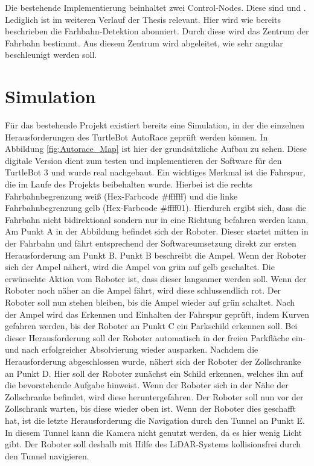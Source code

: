Die bestehende Implementierung beinhaltet zwei Control-Nodes. Diese sind  und . Lediglich  ist im weiteren Verlauf
der Thesis relevant. Hier wird wie bereits beschrieben die Farhbahn-Detektion abonniert. Durch diese wird das Zentrum der Fahrbahn bestimmt. Aus diesem Zentrum wird abgeleitet, wie sehr
angular beschleunigt werden soll.

\section{Simulation}
Für das bestehende Projekt existiert bereits eine Simulation, in der die einzelnen Herausforderungen des TurtleBot AutoRace geprüft werden können. In Abbildung \ref{fig:Autorace_Map}
ist hier der grundsätzliche Aufbau zu sehen. Diese digitale Version dient zum testen und implementieren der Software für den TurtleBot 3 und wurde real nachgebaut. Ein wichtiges
Merkmal ist die Fahrspur, die im Laufe des Projekts beibehalten wurde. Hierbei ist die rechts Fahrbahnbegrenzung weiß (Hex-Farbcode \#ffffff) und die linke Fahrbahnbegrenzung gelb (Hex-Farbcode \#ffff01).
Hierdurch ergibt sich, dass die Fahrbahn nicht bidirektional sondern nur in eine Richtung befahren werden kann.
Am Punkt A in der Abbildung befindet sich der Roboter. Dieser startet mitten in der Fahrbahn und fährt entsprechend der Softwareumsetzung direkt zur ersten Herausforderung am Punkt B.
Punkt B beschreibt die Ampel. Wenn der Roboter sich der Ampel nähert, wird die Ampel von grün auf gelb geschaltet. Die erwünschte Aktion vom Roboter ist, dass dieser langsamer werden soll.
Wenn der Roboter noch näher an die Ampel fährt, wird diese schlussendlich rot. Der Roboter soll nun stehen bleiben, bis die Ampel wieder auf grün schaltet. Nach der Ampel wird das Erkennen und
Einhalten der Fahrspur geprüft, indem Kurven gefahren werden, bis der Roboter an Punkt C ein Parkschild erkennen soll. Bei dieser Herausforderung soll der Roboter automatisch in der freien
Parkfläche ein- und nach erfolgreicher Absolvierung wieder ausparken. Nachdem die Herausforderung abgeschlossen wurde, nähert sich der Roboter der Zollschranke an Punkt D. Hier soll der Roboter
zunächst ein Schild erkennen, welches ihn auf die bevorstehende Aufgabe hinweist. Wenn der Roboter sich in der Nähe der Zollschranke befindet, wird diese heruntergefahren. Der Roboter soll nun
vor der Zollschrank warten, bis diese wieder oben ist. Wenn der Roboter dies geschafft hat, ist die letzte Herausforderung die Navigation durch den Tunnel an Punkt E.
In diesem Tunnel kann die Kamera nicht genutzt werden, da es hier wenig Licht gibt. Der Roboter soll deshalb mit Hilfe des LiDAR-Systems kollisionsfrei durch den Tunnel navigieren.

